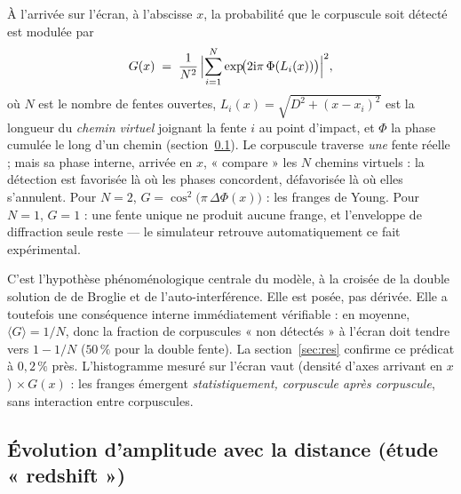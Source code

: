 \documentclass[11pt,a4paper]{article}
\begin{document}
À l'arrivée sur l'écran, à l'abscisse $x$, la probabilité que le corpuscule soit
détecté est modulée par
\begin{equation}\label{eq:gateau}
  G(x) \;=\; \frac{1}{N^2}\,
  \Bigl\lvert \sum_{i=1}^{N} \exp\!\bigl(2\mathrm{i}\pi\,\Phi(L_i(x))\bigr)
  \Bigr\rvert^{2},
\end{equation}
où $N$ est le nombre de fentes ouvertes, $L_i(x) = \sqrt{D^2 + (x - x_i)^2}$ est la
longueur du \emph{chemin virtuel} joignant la fente $i$ au point d'impact, et
$\Phi$ la phase cumulée le long d'un chemin (section~\ref{sec:amplitude}). Le
corpuscule traverse \emph{une} fente réelle ; mais sa phase interne, arrivée en $x$,
« compare » les $N$ chemins virtuels : la détection est favorisée là où les
phases concordent, défavorisée là où elles s'annulent. Pour $N=2$,
$G = \cos^2\!\bigl(\pi\,\Delta\Phi(x)\bigr)$ : les franges de Young. Pour $N=1$,
$G = 1$ : une fente unique ne produit aucune frange, et l'enveloppe de diffraction
seule reste --- le simulateur retrouve automatiquement ce fait expérimental.

C'est l'hypothèse phénoménologique centrale du modèle, à la croisée de la double
solution de de Broglie et de l'auto-interférence. Elle est posée, pas dérivée.
Elle a toutefois une conséquence interne immédiatement vérifiable : en moyenne,
$\langle G \rangle = 1/N$, donc la fraction de corpuscules « non détectés » à
l'écran doit tendre vers $1 - 1/N$ ($50\,\%$ pour la double fente). La
section~\ref{sec:res} confirme ce prédicat à $0{,}2\,\%$ près. L'histogramme mesuré
sur l'écran vaut (densité d'axes arrivant en $x$) $\times\, G(x)$ : les franges
émergent \emph{statistiquement, corpuscule après corpuscule}, sans interaction
entre corpuscules.

\subsection{Évolution d'amplitude avec la distance (étude « redshift »)}
\label{sec:amplitude}
\end{document}
